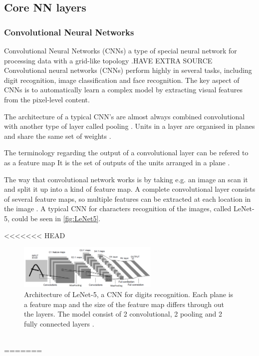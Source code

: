 \subsection{Core NN layers}
\subsubsection{Convolutional Neural Networks}
Convolutional Neural Networks (CNNs) a type of special neural network for processing data with a grid-like topology \citep{Goodfellow2016}.{HAVE EXTRA SOURCE} Convolutional neural networks (CNNs) perform highly in several tasks, including digit recognition, image classification and face recognition. The key aspect of CNNs is to automatically learn a complex model by extracting visual features from the pixel-level content.\citep{Acquarelli2017,LeCun1998}

The architecture of a typical CNN’s are almost always combined convolutional with another type of layer called pooling \citep{Goodfellow2016, LeCun2015}. Units in a layer are organised in planes and share the same set of weights \citep{LeCun1998}.

The terminology regarding the output of a convolutional layer can be refered to as a feature map \citep{Goodfellow2016,LeCun1998} It is the set of outputs of the units arranged in a plane \citep{LeCun1998}.

  
The way that convolutional network works is by taking e.g. an image an scan it and split it up into a kind of feature map. A complete convolutional layer consists of several feature maps, so multiple features can be extracted at each location in the image \citep{LeCun1998}. A typical CNN for characters recognition of the images, called LeNet-5, could be seen in \autoref{fig:LeNet5}.

<<<<<<< HEAD
\\
\begin{figure} [H]
\centering
\includegraphics[width=0.6\textwidth]{figures/LeNet5}
\caption{Architecture of LeNet-5, a CNN for digits recognition. Each plane is a feature map and the size of the feature map differs through out the layers. The model consist of 2 convolutional, 2 pooling and 2 fully connected layers \citep{LeCun1998}.}
\label{fig:LeNet5}  
\end{figure}
\\
=======

